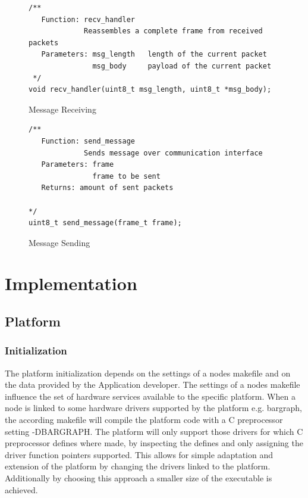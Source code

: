 \documentclass{scrreprt}
\begin{document}
\begin{figure}[!htb]
\lstset{language=C}
\begin{lstlisting}[frame=single]
/**
   Function: recv_handler
             Reassembles a complete frame from received packets
   Parameters: msg_length	length of the current packet
               msg_body 	payload of the current packet
 */
void recv_handler(uint8_t msg_length, uint8_t *msg_body);
\end{lstlisting}
\caption{Message Receiving}
\label{fig:comm-set-recvr}
\end{figure}

\begin{figure}[!htb]
\lstset{language=C}
\begin{lstlisting}[frame=single]
/** 
   Function: send_message
             Sends message over communication interface
   Parameters: frame
               frame to be sent              
   Returns: amount of sent packets

*/
uint8_t send_message(frame_t frame);

\end{lstlisting}
\caption{Message Sending}
\label{fig:comm-send-msg}
\end{figure}


\chapter{Implementation}
\section{Platform}
\subsection{Initialization}
\noindent
The platform initialization depends on the settings of a nodes makefile and on the data provided by the Application developer.
The settings of a nodes makefile influence the set of hardware services available to the specific platform. When a node is
linked to some hardware drivers supported by the platform e.g. bargraph, the according makefile will compile the platform code
with a C preprocessor setting -DBARGRAPH. The platform will only support those drivers for which C preprocessor defines where made,
by inspecting the defines and only assigning the driver function pointers supported. This allows for simple adaptation and extension
of the platform by changing the drivers linked to the platform. Additionally by choosing this approach a smaller size of the executable
is achieved.\\
\end{document}
